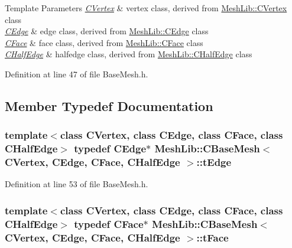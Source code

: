 \begin{DoxyTemplParams}{Template Parameters}
{\em \hyperlink{class_mesh_lib_1_1_c_vertex}{C\+Vertex}} & vertex class, derived from \hyperlink{class_mesh_lib_1_1_c_vertex}{Mesh\+Lib\+::\+C\+Vertex} class \\
\hline
{\em \hyperlink{class_mesh_lib_1_1_c_edge}{C\+Edge}} & edge class, derived from \hyperlink{class_mesh_lib_1_1_c_edge}{Mesh\+Lib\+::\+C\+Edge} class \\
\hline
{\em \hyperlink{class_mesh_lib_1_1_c_face}{C\+Face}} & face class, derived from \hyperlink{class_mesh_lib_1_1_c_face}{Mesh\+Lib\+::\+C\+Face} class \\
\hline
{\em \hyperlink{class_mesh_lib_1_1_c_half_edge}{C\+Half\+Edge}} & halfedge class, derived from \hyperlink{class_mesh_lib_1_1_c_half_edge}{Mesh\+Lib\+::\+C\+Half\+Edge} class \\
\hline
\end{DoxyTemplParams}


Definition at line 47 of file Base\+Mesh.\+h.



\subsection{Member Typedef Documentation}
\subsubsection[{\texorpdfstring{t\+Edge}{tEdge}}]{\setlength{\rightskip}{0pt plus 5cm}template$<$class C\+Vertex, class C\+Edge, class C\+Face, class C\+Half\+Edge$>$ typedef {\bf C\+Edge}$\ast$ {\bf Mesh\+Lib\+::\+C\+Base\+Mesh}$<$ {\bf C\+Vertex}, {\bf C\+Edge}, {\bf C\+Face}, {\bf C\+Half\+Edge} $>$\+::{\bf t\+Edge}}\hypertarget{class_mesh_lib_1_1_c_base_mesh_a966f6321c2cf92b849e77b931a36821b}{}\label{class_mesh_lib_1_1_c_base_mesh_a966f6321c2cf92b849e77b931a36821b}


Definition at line 53 of file Base\+Mesh.\+h.

\subsubsection[{\texorpdfstring{t\+Face}{tFace}}]{\setlength{\rightskip}{0pt plus 5cm}template$<$class C\+Vertex, class C\+Edge, class C\+Face, class C\+Half\+Edge$>$ typedef {\bf C\+Face}$\ast$ {\bf Mesh\+Lib\+::\+C\+Base\+Mesh}$<$ {\bf C\+Vertex}, {\bf C\+Edge}, {\bf C\+Face}, {\bf C\+Half\+Edge} $>$\+::{\bf t\+Face}}\hypertarget{class_mesh_lib_1_1_c_base_mesh_ad231546551e85dffb41c9aa9bcf5b86b}{}\label{class_mesh_lib_1_1_c_base_mesh_ad231546551e85dffb41c9aa9bcf5b86b}


